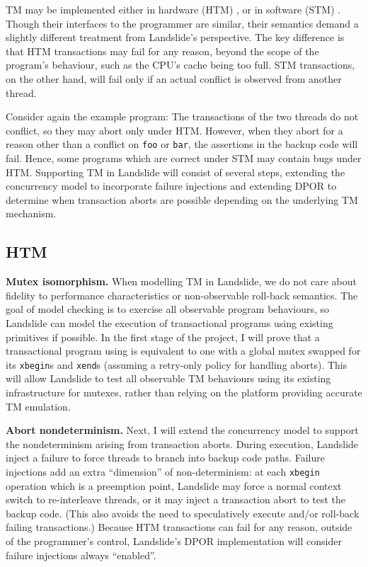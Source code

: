 TM may be implemented either in hardware (HTM) \cite{htm-haswell}, or in software (STM) \cite{stm-pldi06}.
Though their interfaces to the programmer are similar, their semantics demand a slightly different treatment from Landslide's perspective.
The key difference is that HTM transactions may fail for any reason, beyond the scope of the program's behaviour, such as the CPU's cache being too full.
STM transactions, on the other hand, will fail only if an actual conflict is observed from another thread.

Consider again the example program: The transactions of the two threads do not conflict, so they may abort only under HTM.
However, when they abort for a reason other than a conflict on {\tt foo} or {\tt bar}, the assertions in the backup code will fail.
Hence, some programs which are correct under STM may contain bugs under HTM.
Supporting TM in Landslide will consist of several steps, extending the concurrency model to incorporate failure injections and extending DPOR to determine when transaction aborts are possible depending on the underlying TM mechanism.

\subsection{HTM}

{\bf Mutex isomorphism.}
When modelling TM in Landslide, we do not care about fidelity to performance characteristics or non-observable roll-back semantics.
The goal of model checking is to exercise all observable program behaviours,
so Landslide can model the execution of transactional programs using existing primitives if possible.
In the first stage of the project, I will prove that a transactional program using is equivalent to one with a global mutex swapped for its {\tt xbegin}s and {\tt xend}s (assuming a retry-only policy for handling aborts).
This will allow Landslide to test all observable TM behaviours using its existing infrastructure for mutexes,
rather than relying on the platform providing accurate TM emulation.

{\bf Abort nondeterminism.}
Next, I will extend the concurrency model to support the nondeterminism arising from transaction aborts.
During execution, Landslide inject a failure to force threads to branch into backup code paths.
Failure injections add an extra ``dimension'' of non-determinism:
at each {\tt xbegin} operation which is a preemption point, Landslide may force a normal context switch to re-interleave threads, or it may inject a transaction abort to test the backup code.
(This also avoids the need to speculatively execute and/or roll-back failing transactions.)
Because HTM transactions can fail for any reason, outside of the programmer's control, Landslide's DPOR implementation will consider failure injections always ``enabled''.


